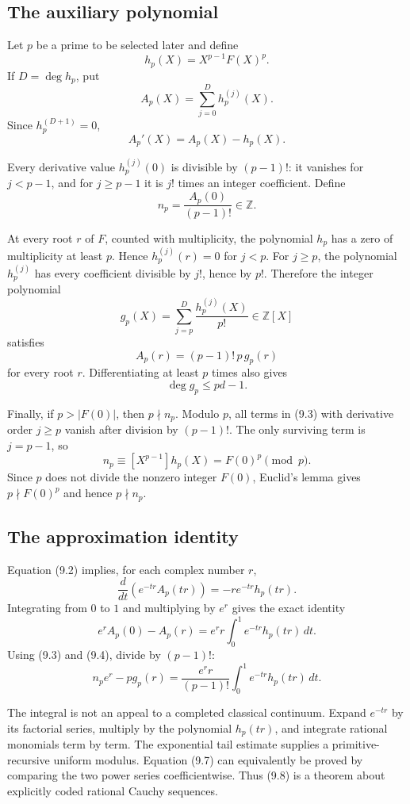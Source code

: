 \documentclass[11pt]{article}
\newcommand{\Z}{\mathbb{Z}}
\begin{document}
\subsection{The auxiliary polynomial}

Let $p$ be a prime to be selected later and define
\[
  h_p(X)=X^{p-1}F(X)^p.
\]
If $D=\deg h_p$, put
\[
  A_p(X)=\sum_{j=0}^{D}h_p^{(j)}(X).
\]
Since $h_p^{(D+1)}=0$,
\[
  A_p'(X)=A_p(X)-h_p(X).                                   \tag{9.2}
\]

Every derivative value $h_p^{(j)}(0)$ is divisible by $(p-1)!$: it vanishes for $j<p-1$, and for $j\ge p-1$ it is $j!$ times an integer coefficient.  Define
\[
  n_p=\frac{A_p(0)}{(p-1)!}\in\Z.                          \tag{9.3}
\]

At every root $r$ of $F$, counted with multiplicity, the polynomial $h_p$ has a zero of multiplicity at least $p$.  Hence $h_p^{(j)}(r)=0$ for $j<p$.  For $j\ge p$, the polynomial $h_p^{(j)}$ has every coefficient divisible by $j!$, hence by $p!$.  Therefore the integer polynomial
\[
  g_p(X)=\sum_{j=p}^{D}\frac{h_p^{(j)}(X)}{p!}\in\Z[X]
\]
satisfies
\[
  A_p(r)=(p-1)!\,p\,g_p(r)                                \tag{9.4}
\]
for every root $r$.  Differentiating at least $p$ times also gives
\[
  \deg g_p\le pd-1.                                       \tag{9.5}
\]

Finally, if $p>|F(0)|$, then $p\nmid n_p$.  Modulo $p$, all terms in (9.3) with derivative order $j\ge p$ vanish after division by $(p-1)!$.  The only surviving term is $j=p-1$, so
\[
  n_p\equiv [X^{p-1}]h_p(X)=F(0)^p\pmod p.                \tag{9.6}
\]
Since $p$ does not divide the nonzero integer $F(0)$, Euclid's lemma gives $p\nmid F(0)^p$ and hence $p\nmid n_p$.

\subsection{The approximation identity}

Equation (9.2) implies, for each complex number $r$,
\[
  \frac{d}{dt}\left(e^{-tr}A_p(tr)\right)
     =-r e^{-tr}h_p(tr).
\]
Integrating from $0$ to $1$ and multiplying by $e^r$ gives the exact identity
\[
  e^r A_p(0)-A_p(r)
   =e^r r\int_0^1e^{-tr}h_p(tr)\,dt.                       \tag{9.7}
\]
Using (9.3) and (9.4), divide by $(p-1)!$:
\[
  n_p e^r-pg_p(r)
   =\frac{e^r r}{(p-1)!}
      \int_0^1e^{-tr}h_p(tr)\,dt.                         \tag{9.8}
\]

The integral is not an appeal to a completed classical continuum.  Expand $e^{-tr}$ by its factorial series, multiply by the polynomial $h_p(tr)$, and integrate rational monomials term by term.  The exponential tail estimate supplies a primitive-recursive uniform modulus.  Equation (9.7) can equivalently be proved by comparing the two power series coefficientwise.  Thus (9.8) is a theorem about explicitly coded rational Cauchy sequences.
\end{document}
